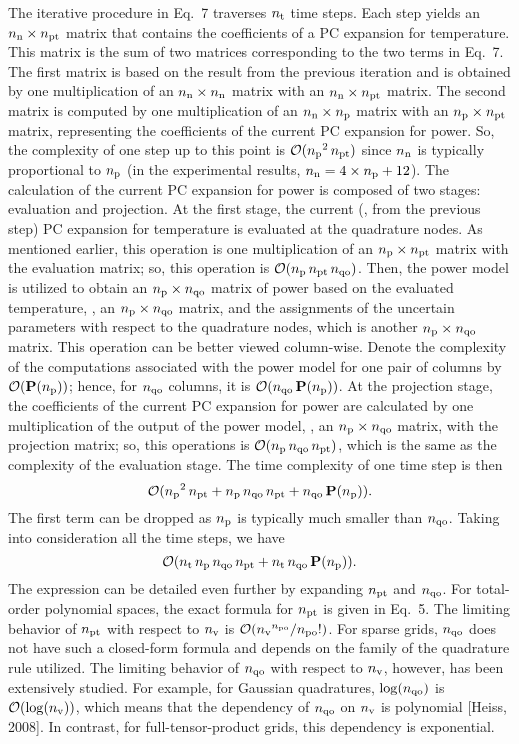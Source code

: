 \begin{authors}
The iterative procedure in Eq.~7 traverses ${n_\text{t}}$ time steps.
Each step yields an ${n_\text{n}} \times {n_\text{pt}}$ matrix that contains the coefficients of a PC expansion for temperature.
This matrix is the sum of two matrices corresponding to the two terms in Eq.~7.
The first matrix is based on the result from the previous iteration and is obtained by one multiplication of an ${n_\text{n}} \times {n_\text{n}}$ matrix with an ${n_\text{n}} \times {n_\text{pt}}$ matrix.
The second matrix is computed by one multiplication of an ${n_\text{n}} \times {n_\text{p}}$ matrix with an ${n_\text{p}} \times {n_\text{pt}}$ matrix, representing the coefficients of the current PC expansion for power.
So, the complexity of one step up to this point is $\mathcal{O}({n_\text{p}}^2 \, {n_\text{pt}})$ since ${n_\text{n}}$ is typically proportional to ${n_\text{p}}$ (in the experimental results, ${n_\text{n}} = 4 \times {n_\text{p}} + 12$).
The calculation of the current PC expansion for power is composed of two stages: evaluation and projection.
At the first stage, the current (\ie, from the previous step) PC expansion for temperature is evaluated at the quadrature nodes.
As mentioned earlier, this operation is one multiplication of an ${n_\text{p}} \times {n_\text{pt}}$ matrix with the evaluation matrix; so, this operation is $\mathcal{O}({n_\text{p}} \, {n_\text{pt}} \, {n_\text{qo}})$.
Then, the power model is utilized to obtain an ${n_\text{p}} \times {n_\text{qo}}$ matrix of power based on the evaluated temperature, \ie, an ${n_\text{p}} \times {n_\text{qo}}$ matrix, and the assignments of the uncertain parameters with respect to the quadrature nodes, which is another ${n_\text{p}} \times {n_\text{qo}}$ matrix.
This operation can be better viewed column-wise.
Denote the complexity of the computations associated with the power model for one pair of columns by $\mathcal{O}(\mathbf{P}({n_\text{p}}))$; hence, for ${n_\text{qo}}$ columns, it is $\mathcal{O}({n_\text{qo}} \, \mathbf{P}({n_\text{p}}))$.
At the projection stage, the coefficients of the current PC expansion for power are calculated by one multiplication of the output of the power model, \ie, an ${n_\text{p}} \times {n_\text{qo}}$ matrix, with the projection matrix; so, this operations is $\mathcal{O}({n_\text{p}} \, {n_\text{qo}} \, {n_\text{pt}})$, which is the same as the complexity of the evaluation stage.
The time complexity of one time step is then
\[
  \mathcal{O}({n_\text{p}}^2 \, {n_\text{pt}} + {n_\text{p}} \, {n_\text{qo}} \, {n_\text{pt}} + {n_\text{qo}} \, \mathbf{P}({n_\text{p}})).
\]
The first term can be dropped as ${n_\text{p}}$ is typically much smaller than ${n_\text{qo}}$.
Taking into consideration all the time steps, we have
\[
  \mathcal{O}({n_\text{t}} \, {n_\text{p}} \, {n_\text{qo}} \, {n_\text{pt}} + {n_\text{t}} \, {n_\text{qo}} \, \mathbf{P}({n_\text{p}})).
\]
The expression can be detailed even further by expanding ${n_\text{pt}}$ and ${n_\text{qo}}$.
For total-order polynomial spaces, the exact formula for ${n_\text{pt}}$ is given in Eq.~5.
The limiting behavior of ${n_\text{pt}}$ with respect to ${n_\text{v}}$ is $\mathcal{O}({n_\text{v}}^{n_\text{po}} / {n_\text{po}}!)$.
For sparse grids, ${n_\text{qo}}$ does not have such a closed-form formula and depends on the family of the quadrature rule utilized.
The limiting behavior of ${n_\text{qo}}$ with respect to ${n_\text{v}}$, however, has been extensively studied.
For example, for Gaussian quadratures, $\log({n_\text{qo}})$ is $\mathcal{O}(\log({n_\text{v}}))$, which means that the dependency of ${n_\text{qo}}$ on ${n_\text{v}}$ is polynomial [Heiss, 2008].
In contrast, for full-tensor-product grids, this dependency is exponential.


\end{authors}
